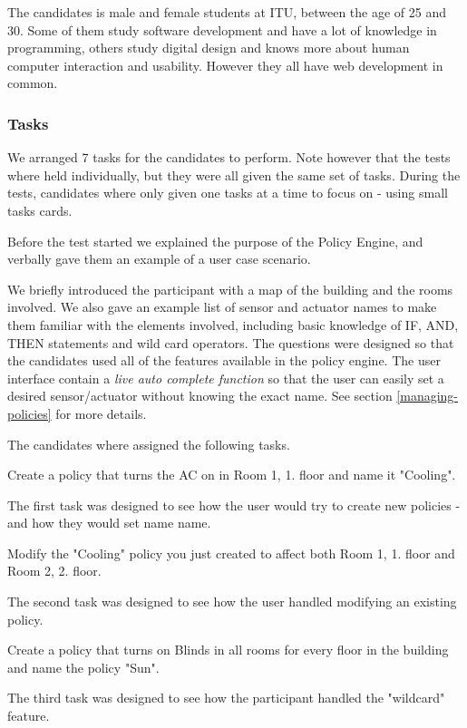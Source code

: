 The candidates is male and female students at ITU, between the age of 25 and 30. Some of them study software development and have a lot of knowledge in programming, others study digital design and knows more about human computer interaction and usability. However they all have web development in common.

\subsubsection{Tasks}
We arranged 7 tasks for the candidates to perform. Note however that the tests where held individually, but they were all given the same set of tasks. 
During the tests, candidates where only given one tasks at a time to focus on - using small tasks cards.

Before the test started we explained the purpose of the Policy Engine, and verbally gave them an example of a user case scenario.

We briefly introduced the participant with a map of the building and the rooms involved. We also gave an example list of sensor and actuator names to make them familiar with the elements involved, including basic knowledge of IF, AND, THEN statements and wild card operators. The questions were designed so that the candidates used all of the features available in the policy engine. The user interface contain a \textit{live auto complete function} so that the user can easily set a desired sensor/actuator without knowing the exact name. See section \ref{managing-policies} for more details.

The candidates where assigned the following tasks. 

\begin{framed}
Create a policy that turns the AC on in Room 1, 1. floor and name it "Cooling".
\end{framed}
The first task was designed to see how the user would try to create new policies - and how they would set name name.

\begin{framed}
Modify the "Cooling" policy you just created to affect both Room 1, 1. floor and Room 2, 2. floor.
\end{framed}
The second task was designed to see how the user handled modifying an existing policy.

\begin{framed}
Create a policy that turns on Blinds in all rooms for every floor in the building and name the policy "Sun".
\end{framed}
The third task was designed to see how the participant handled the "wildcard" feature.


